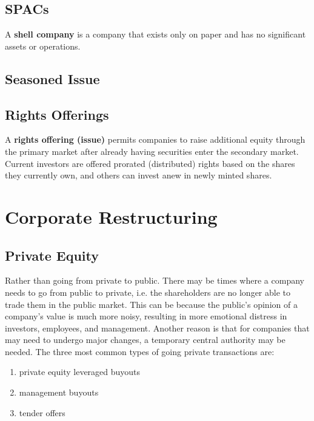 \documentclass{article}
\begin{document}
  \subsection{SPACs}

    \begin{definition}
      \label{def:shell-company}
      A \textbf{shell company} is a company that exists only on paper and has no significant assets or operations. 
    \end{definition}

  \subsection{Seasoned Issue}

  \subsection{Rights Offerings}

    \begin{definition}
      \label{def:rights-offering}
      A \textbf{rights offering (issue)} permits companies to raise additional equity through the primary market after already having securities enter the secondary market. Current investors are offered prorated (distributed) rights based on the shares they currently own, and others can invest anew in newly minted shares.
    \end{definition}

\section{Corporate Restructuring}

  \subsection{Private Equity}

    Rather than going from private to public. There may be times where a company needs to go from public to private, i.e. the shareholders are no longer able to trade them in the public market. This can be because the public's opinion of a company's value is much more noisy, resulting in more emotional distress in investors, employees, and management. Another reason is that for companies that may need to undergo major changes, a temporary central authority may be needed. The three most common types of going private transactions are: 
    \begin{enumerate}
      \item private equity leveraged buyouts
      \item management buyouts
      \item tender offers
    \end{enumerate}
\end{document}

